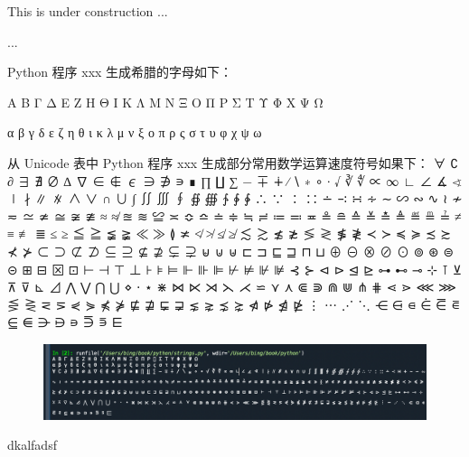 \documentclass[main.tex]{subfiles}
\begin{document}
This is under construction
...

...

Python 程序 xxx 生成希腊的字母如下：

Α Β Γ Δ Ε Ζ Η Θ Ι Κ Λ Μ Ν Ξ Ο Π Ρ Σ Τ Υ Φ Χ Ψ Ω

α β γ δ ε ζ η θ ι κ λ μ ν ξ ο π ρ ς σ τ υ φ χ ψ ω

从 Unicode 表中 Python 程序 xxx 生成部分常用数学运算速度符号如果下：
∀ ∁ ∂ ∃ ∄ ∅ ∆ ∇ ∈ ∉ ∊ ∋ ∌ ∍ ∎ ∏ ∐ ∑ − ∓ ∔ ∕ ∖ ∗ ∘ ∙ √ ∛ ∜ ∝ ∞ ∟ ∠ ∡ ∢ ∣ ∤ ∥ ∦ ∧ ∨ ∩ ∪ ∫ ∬ ∭ ∮ ∯ ∰ ∱ ∲ ∳ ∴ ∵ ∶ ∷ ∸ ∹ ∺ ∻ ∼ ∽ ∾ ∿ ≀ ≁ ≂ ≃ ≄ ≅ ≆ ≇ ≈ ≉ ≊ ≋ ≌ ≍ ≎ ≏ ≐ ≑ ≒ ≓ ≔ ≕ ≖ ≗ ≘ ≙ ≚ ≛ ≜ ≝ ≞ ≟ ≠ ≡ ≢ ≣ ≤ ≥ ≦ ≧ ≨ ≩ ≪ ≫ ≬ ≭ ≮ ≯ ≰ ≱ ≲ ≳ ≴ ≵ ≶ ≷ ≸ ≹ ≺ ≻ ≼ ≽ ≾ ≿ ⊀ ⊁ ⊂ ⊃ ⊄ ⊅ ⊆ ⊇ ⊈ ⊉ ⊊ ⊋ ⊌ ⊍ ⊎ ⊏ ⊐ ⊑ ⊒ ⊓ ⊔ ⊕ ⊖ ⊗ ⊘ ⊙ ⊚ ⊛ ⊜ ⊝ ⊞ ⊟ ⊠ ⊡ ⊢ ⊣ ⊤ ⊥ ⊦ ⊧ ⊨ ⊩ ⊪ ⊫ ⊬ ⊭ ⊮ ⊯ ⊰ ⊱ ⊲ ⊳ ⊴ ⊵ ⊶ ⊷ ⊸ ⊹ ⊺ ⊻ ⊼ ⊽ ⊾ ⊿ ⋀ ⋁ ⋂ ⋃ ⋄ ⋅ ⋆ ⋇ ⋈ ⋉ ⋊ ⋋ ⋌ ⋍ ⋎ ⋏ ⋐ ⋑ ⋒ ⋓ ⋔ ⋕ ⋖ ⋗ ⋘ ⋙ ⋚ ⋛ ⋜ ⋝ ⋞ ⋟ ⋠ ⋡ ⋢ ⋣ ⋤ ⋥ ⋦ ⋧ ⋨ ⋩ ⋪ ⋫ ⋬ ⋭ ⋮ ⋯ ⋰ ⋱ ⋲ ⋳ ⋴ ⋵ ⋶ ⋷ ⋸ ⋹ ⋺ ⋻ ⋼ ⋽ ⋾ ⋿

\begin{figure}
	\centering
	\includegraphics{images/greek_math_symbols.png}
\end{figure}


dkalfadsf

\newpage
\end{document}
